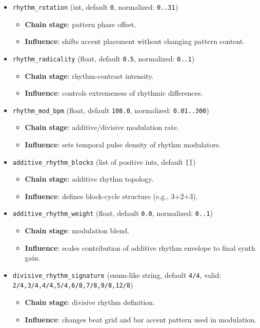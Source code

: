 \documentclass[11pt,a4paper]{article}
\begin{document}
\begin{itemize}
  \item \texttt{rhythm\_rotation} (int, default \texttt{0}, normalized: \texttt{0..31})
  \begin{itemize}
    \item \textbf{Chain stage}: pattern phase offset.
    \item \textbf{Influence}: shifts accent placement without changing pattern content.
  \end{itemize}

  \item \texttt{rhythm\_radicality} (float, default \texttt{0.5}, normalized: \texttt{0..1})
  \begin{itemize}
    \item \textbf{Chain stage}: rhythm-contrast intensity.
    \item \textbf{Influence}: controls extremeness of rhythmic differences.
  \end{itemize}

  \item \texttt{rhythm\_mod\_bpm} (float, default \texttt{108.0}, normalized: \texttt{0.01..300})
  \begin{itemize}
    \item \textbf{Chain stage}: additive/divisive modulation rate.
    \item \textbf{Influence}: sets temporal pulse density of rhythm modulators.
  \end{itemize}

  \item \texttt{additive\_rhythm\_blocks} (list of positive ints, default \texttt{[]})
  \begin{itemize}
    \item \textbf{Chain stage}: additive rhythm topology.
    \item \textbf{Influence}: defines block-cycle structure (e.g., 3+2+3).
  \end{itemize}

  \item \texttt{additive\_rhythm\_weight} (float, default \texttt{0.0}, normalized: \texttt{0..1})
  \begin{itemize}
    \item \textbf{Chain stage}: modulation blend.
    \item \textbf{Influence}: scales contribution of additive rhythm envelope to final synth gain.
  \end{itemize}

  \item \texttt{divisive\_rhythm\_signature} (enum-like string, default \texttt{4/4}, valid: \texttt{2/4,3/4,4/4,5/4,6/8,7/8,9/8,12/8})
  \begin{itemize}
    \item \textbf{Chain stage}: divisive rhythm definition.
    \item \textbf{Influence}: changes beat grid and bar accent pattern used in modulation.
  \end{itemize}


\end{itemize}
\end{document}

